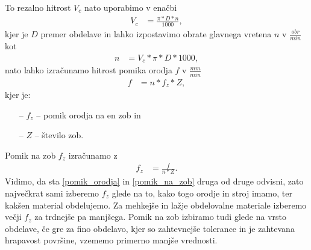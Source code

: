 To rezalno hitrost \(V_c\) nato uporabimo v enačbi
\begin{equation}
	\begin{split}
		V_c &= \frac{\pi*D*n}{1000},
	\end{split}
\end{equation}
kjer je \(D\) premer obdelave in lahko izpostavimo obrate glavnega
vretena \(n\) v \(\frac{obr}{min}\) kot
\begin{equation}
	\begin{split}
		n &= V_c * \pi * D * 1000,
	\end{split}
\end{equation}
nato lahko izračunamo hitrost pomika orodja \(f\) v \(\frac{mm}{min}\)
\begin{equation}
	\label{pomik_orodja}
	\begin{split}
		f &= n * f_z * Z,
	\end{split}
\end{equation}
kjer je:
\begin{itemize}
	\item[--] \(f_z\) -- pomik orodja na en zob in
	\item[--] \(Z\) -- število zob.
\end{itemize}
Pomik na zob \(f_z\) izračunamo z
\begin{equation}
	\label{pomik_na_zob}
	\begin{split}
		f_z &= \frac{f}{n * Z}.
	\end{split}
\end{equation}
Vidimo, da sta \eqref{pomik_orodja} in \eqref{pomik_na_zob} druga od
druge odvisni, zato največkrat sami izberemo \(f_z\) glede na to,
kako togo orodje in stroj imamo, ter kakšen material obdelujemo.
Za mehkejše in lažje obdelovalne materiale izberemo večji \(f_z\)
za trdnejše pa manjšega. Pomik na zob izbiramo tudi glede na vrsto obdelave,
če gre za fino obdelavo, kjer so zahtevnejše tolerance in je zahtevana
hrapavost površine, vzememo primerno manjše vrednosti.